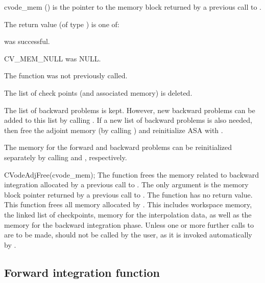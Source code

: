 {
  \begin{args}
  \item[cvode\_mem] () 
    is the pointer to the {\cvodes} memory block returned by a previous call to
    .
  \end{args}
}
{
   The return value  (of type ) is one of:
   \begin{args}
   \item[\Id{CV\_SUCCESS}] 
      was successful.
   \item[CV\_MEM\_NULL] 
      was NULL.
   \item[\Id{CV\_NO\_ADJ}]
     The function  was not previously called.
   \end{args}
}
{
  The list of check points (and associated memory) is deleted.

  The list of backward problems is kept. However, new backward problems can 
  be added to this list by calling . If a new list of backward
  problems is also needed, then free the adjoint memory (by calling
  ) and reinitialize ASA with .

  The {\cvodes} memory for the forward and backward problems can be reinitialized
  separately by calling  and , respectively.
}
{
  CVodeAdjFree(cvode\_mem);
}
{
  The function  frees the memory related to backward integration
  allocated by a previous call to .
}
{
  The only argument is the {\cvodes} memory block pointer returned by a previous call 
  to .
}
{
  The function  has no return value.
}
{
  This function frees all memory allocated by . This
  includes workspace memory, the linked list of checkpoints, memory
  for the interpolation data, as well as the {\cvodes} memory for the
  backward integration phase.  Unless one or more further calls to 
  are to be made,  should not be called by the user, as it is
  invoked automatically by .
}

\subsection{Forward integration function}
\label{sss:cvsolvef}

